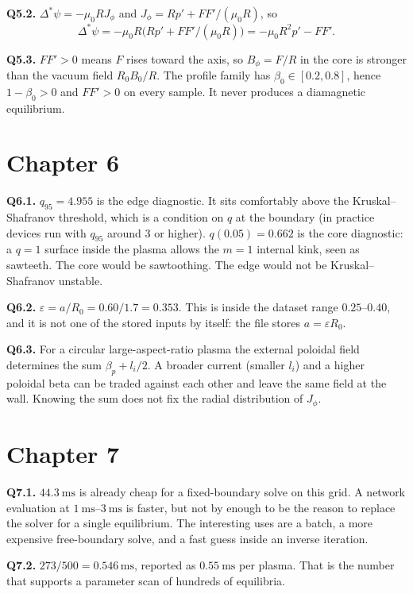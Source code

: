 \documentclass[11pt,a4paper,oneside,openany]{book}
\numberwithin{equation}{chapter}
\newcommand{\Dstar}{\Delta^{*}}
\theoremstyle{definition}
\begin{document}
\textbf{Q5.2.} \(\Dstar\psi=-\mu_{0} R J_{\phi}\) and \(J_{\phi}=R p'+FF'/(\mu_{0} R)\), so
\[
\Dstar\psi=-\mu_{0} R\bigl(R p'+FF'/(\mu_{0} R)\bigr)=-\mu_{0} R^{2} p'-FF'.
\]

\textbf{Q5.3.} \(FF'>0\) means \(F\) rises toward the axis, so \(B_{\phi}=F/R\) in the core is stronger than the vacuum field \(R_{0} B_{0}/R\). The profile family has \(\beta_{0}\in[0.2,0.8]\), hence \(1-\beta_{0}>0\) and \(FF'>0\) on every sample. It never produces a diamagnetic equilibrium.

\section*{Chapter 6}

\textbf{Q6.1.} \(q_{95}=4.955\) is the edge diagnostic. It sits comfortably above the Kruskal--Shafranov threshold, which is a condition on \(q\) at the boundary (in practice devices run with \(q_{95}\) around \(3\) or higher). \(q(0.05)=0.662\) is the core diagnostic: a \(q=1\) surface inside the plasma allows the \(m=1\) internal kink, seen as sawteeth. The core would be sawtoothing. The edge would not be Kruskal--Shafranov unstable.

\textbf{Q6.2.} \(\varepsilon=a/R_{0}=0.60/1.7=0.353\). This is inside the dataset range \(0.25\)--\(0.40\), and it is not one of the stored inputs by itself: the file stores \(a=\varepsilon R_{0}\).

\textbf{Q6.3.} For a circular large-aspect-ratio plasma the external poloidal field determines the sum \(\beta_{p}+l_{i}/2\). A broader current (smaller \(l_{i}\)) and a higher poloidal beta can be traded against each other and leave the same field at the wall. Knowing the sum does not fix the radial distribution of \(J_{\phi}\).

\section*{Chapter 7}

\textbf{Q7.1.} \(\qty{44.3}{\milli\second}\) is already cheap for a fixed-boundary solve on this grid. A network evaluation at \(\qtyrange{1}{3}{\milli\second}\) is faster, but not by enough to be the reason to replace the solver for a single equilibrium. The interesting uses are a batch, a more expensive free-boundary solve, and a fast guess inside an inverse iteration.

\textbf{Q7.2.} \(273/500=0.546\,\mathrm{ms}\), reported as \(\qty{0.55}{\milli\second}\) per plasma. That is the number that supports a parameter scan of hundreds of equilibria.
\end{document}
